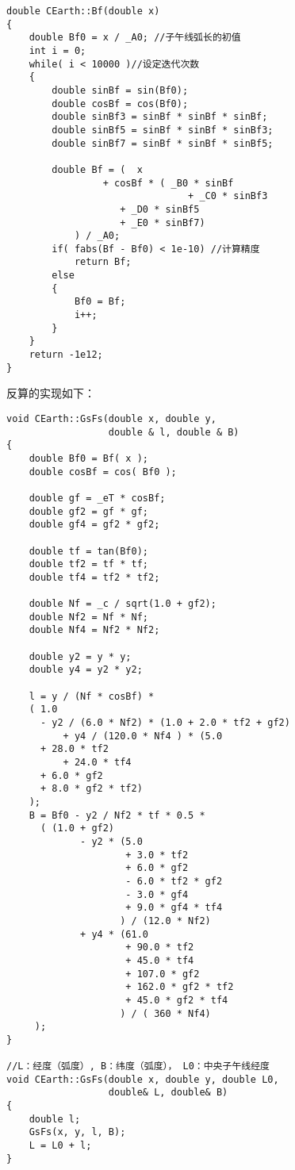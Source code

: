 \begin{verbatim}
double CEarth::Bf(double x)
{
    double Bf0 = x / _A0; //子午线弧长的初值
    int i = 0;
    while( i < 10000 )//设定迭代次数
    {
        double sinBf = sin(Bf0);
        double cosBf = cos(Bf0);
        double sinBf3 = sinBf * sinBf * sinBf;
        double sinBf5 = sinBf * sinBf * sinBf3;
        double sinBf7 = sinBf * sinBf * sinBf5;

        double Bf = (  x
                 + cosBf * ( _B0 * sinBf
                                + _C0 * sinBf3
                    + _D0 * sinBf5
                    + _E0 * sinBf7)
            ) / _A0;
        if( fabs(Bf - Bf0) < 1e-10) //计算精度
            return Bf;
        else
        {
            Bf0 = Bf;
            i++;
        }
    }
    return -1e12;
}
\end{verbatim}

反算的实现如下：

\begin{verbatim}
void CEarth::GsFs(double x, double y,
                  double & l, double & B)
{
    double Bf0 = Bf( x );
    double cosBf = cos( Bf0 );

    double gf = _eT * cosBf;
    double gf2 = gf * gf;
    double gf4 = gf2 * gf2;

    double tf = tan(Bf0);
    double tf2 = tf * tf;
    double tf4 = tf2 * tf2;

    double Nf = _c / sqrt(1.0 + gf2);
    double Nf2 = Nf * Nf;
    double Nf4 = Nf2 * Nf2;

    double y2 = y * y;
    double y4 = y2 * y2;

    l = y / (Nf * cosBf) *
    ( 1.0
      - y2 / (6.0 * Nf2) * (1.0 + 2.0 * tf2 + gf2)
          + y4 / (120.0 * Nf4 ) * (5.0
      + 28.0 * tf2
          + 24.0 * tf4
      + 6.0 * gf2
      + 8.0 * gf2 * tf2)
    );
    B = Bf0 - y2 / Nf2 * tf * 0.5 *
      ( (1.0 + gf2)
             - y2 * (5.0
                     + 3.0 * tf2
                     + 6.0 * gf2
                     - 6.0 * tf2 * gf2
                     - 3.0 * gf4
                     + 9.0 * gf4 * tf4
                    ) / (12.0 * Nf2)
             + y4 * (61.0
                     + 90.0 * tf2
                     + 45.0 * tf4
                     + 107.0 * gf2
                     + 162.0 * gf2 * tf2
                     + 45.0 * gf2 * tf4
                    ) / ( 360 * Nf4)
     );
}

//L：经度（弧度）, B：纬度（弧度）， L0：中央子午线经度
void CEarth::GsFs(double x, double y, double L0,
                  double& L, double& B)
{
    double l;
    GsFs(x, y, l, B);
    L = L0 + l;
}
\end{verbatim}

